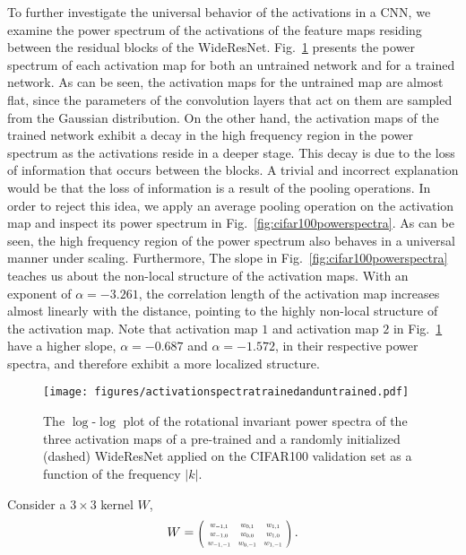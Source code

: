 \documentclass{article}
\newcommand\scalemath[2]{\scalebox{#1}{\mbox{\ensuremath{\displaystyle #2}}}}
\begin{document}
To further investigate the universal behavior of the activations in a CNN, we examine the power spectrum of the activations of the feature maps residing between the residual blocks of the WideResNet. Fig.~\ref{fig:actuntrained} presents the power spectrum of each activation map for both an untrained network and for a trained network. As can be seen, the activation maps for the untrained map are almost flat, since the parameters of the convolution layers that act on them are sampled from the Gaussian distribution. On the other hand, the activation maps of the trained network exhibit a decay in the high frequency region in the power spectrum as the activations reside in a deeper stage.  This decay is due to the loss of information that occurs between the blocks. A trivial and incorrect explanation would be that the loss of information is a result of the pooling operations. In order to reject this idea, we apply an average pooling operation on the activation map and inspect its power spectrum in Fig.~\ref{fig:cifar100powerspectra}. As can be seen, the high frequency region of the power spectrum also behaves in a universal manner under scaling. Furthermore, The slope in Fig.~\ref{fig:cifar100powerspectra} teaches us about the non-local structure of the activation maps. With an exponent of $\alpha=-3.261$, the correlation length of the activation map increases almost linearly with the distance, pointing to the highly non-local structure of the activation map. Note that activation map $1$ and activation map $2$ in Fig.~\ref{fig:actuntrained} have a higher slope, $\alpha\!=-0.687$ and $\alpha=-1.572$, in their respective power spectra, and therefore exhibit a more localized structure. 


\begin{figure}[t]
\begin{center}
   \texttt{[image: figures/activationspectratrainedanduntrained.pdf]}
   \caption{The $\log$-$\log$ plot of the rotational invariant power spectra of the three activation maps of a pre-trained and a randomly initialized (dashed) WideResNet applied on the CIFAR100 validation set as a function of the frequency $\left \vert k \right \vert$. }
\label{fig:actuntrained}
\end{center}
\end{figure}



\smallskip
{}
Consider a $3\times 3$ kernel $W$,
\begin{equation}
W =\scalemath{0.6}{ \left( \begin{array}{ccc} w_{-1,1} & w_{0,1} & w_{1,1} \\  w_{-1,0} & w_{0,0} & w_{1,0} \\ w_{-1,-1} & w_{0,-1} & w_{1,-1}\end{array}\right)} \,.
\end{equation}
\end{document}
